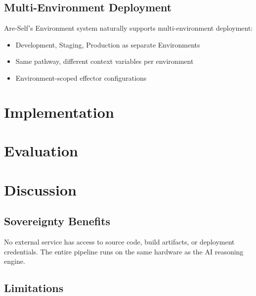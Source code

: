 \documentclass[man,12pt,floatsintext]{apa7}
\begin{document}
\subsection{Multi-Environment Deployment}

Are-Self's Environment system naturally supports multi-environment deployment:

\begin{itemize}
  \item Development, Staging, Production as separate Environments
  \item Same pathway, different context variables per environment
  \item Environment-scoped effector configurations
\end{itemize}

\section{Implementation}


\section{Evaluation}


\section{Discussion}

\subsection{Sovereignty Benefits}

No external service has access to source code, build artifacts, or deployment credentials.
The entire pipeline runs on the same hardware as the AI reasoning engine.

\subsection{Limitations}
\end{document}
